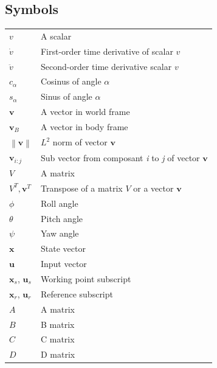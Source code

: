 \documentclass[a4paper, 12pt]{report}
\newcommand\norm[1]{\left\lVert#1\right\rVert}
\begin{document}
\subsection*{Symbols}
\begin{table}[h]
\centering
\begin{tabular}{p{8cm} p{8cm}}
$v$ \dotfill & A scalar \\
$\dot v$ \dotfill & First-order time derivative of scalar $v$ \\
$ \ddot v$ \dotfill & Second-order time derivative scalar $v$\\
$c_{\alpha}$ \dotfill & Cosinus of angle $\alpha$ \\
$s_{\alpha}$ \dotfill & Sinus of angle $\alpha$ \\
$\boldsymbol{v}$ \dotfill & A vector in world frame \\
$\boldsymbol{v}_B$ \dotfill & A vector in body frame \\
$\norm{\boldsymbol{v}}$ \dotfill & $L^2$ norm of vector $\boldsymbol{v}$ \\
$\boldsymbol{v}_{i:j}$ \dotfill & Sub vector from composant \emph{i} to \emph{j} of vector $\boldsymbol{v}$\\
$V$ \dotfill & A matrix \\
$V^T,\boldsymbol{v}^T$ \dotfill & Transpose of a matrix $V$ or a vector $\boldsymbol{v}$ \\
$\phi$ \dotfill & Roll angle \\
$\theta$ \dotfill & Pitch angle \\
$\psi$ \dotfill & Yaw angle \\
$\boldsymbol{x}$ \dotfill & State vector \\
$\boldsymbol{u}$ \dotfill & Input vector \\
$\boldsymbol{x}_s$, $\boldsymbol{u}_s$ \dotfill & Working point subscript \\
$\boldsymbol{x}_r$, $\boldsymbol{u}_r$ \dotfill & Reference subscript \\
$A$ \dotfill & A matrix \\
$B$ \dotfill & B matrix \\
$C$ \dotfill & C matrix \\
$D$ \dotfill & D matrix \\
\end{tabular}
\end{table}
\end{document}
